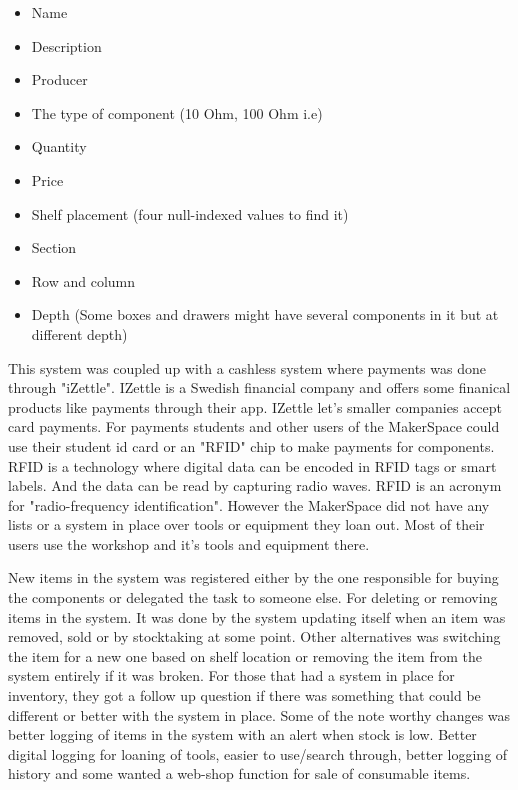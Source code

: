 \begin{itemize}
    \item Name 
    \item Description
    \item Producer
    \item The type of component (10 Ohm, 100 Ohm i.e)
    \item Quantity
    \item Price
    \item Shelf placement (four null-indexed values to find it) 
    \item Section
    \item Row and column
    \item Depth (Some boxes and drawers might have several components in it but at different depth)
\end{itemize}
This system was coupled up with a cashless system where payments was done through "iZettle"\cite{iZettle_Financial_Products}. IZettle is a Swedish financial company and offers some finanical products like payments through their app. IZettle let's smaller companies accept card payments\cite{What_is_iZettle}. For payments students and other users of the MakerSpace could use their student id card or an "RFID" chip to make payments for components. RFID is a technology where digital data can be encoded in RFID tags or smart labels. And the data can be read by capturing radio waves. RFID is an acronym for "radio-frequency identification"\cite{What_is_RFID}. However the MakerSpace did not have any lists or a system in place over tools or equipment they loan out. Most of their users use the workshop and it's tools and equipment there. 

New items in the system was registered either by the one responsible for buying the components or delegated the task to someone else. For deleting or removing items in the system. It was done by the system updating itself when an item was removed, sold or by stocktaking at some point. Other alternatives was switching the item for a new one based on shelf location or removing the item from the system entirely if it was broken.
For those that had a system in place for inventory, they got a follow up question if there was something that could be different or better with the system in place. Some of the note worthy changes was better logging of items in the system with an alert when stock is low. Better digital logging for loaning of tools, easier to use/search through, better logging of history and some wanted a web-shop function for sale of consumable items. 


